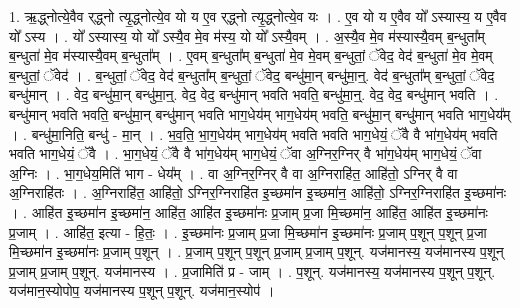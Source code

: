 \documentclass[17pt]{extarticle}
\begin{document}
1. ऋ॒द्ध्नोत्ये॒वैव र्‌द्ध्नो त्यृ॒द्ध्नोत्ये॒व यो य ए॒व र्‌द्ध्नो त्यृ॒द्ध्नोत्ये॒व यः । . ए॒व यो य ए॒वैव यो᳚ ऽस्यास्य॒ य ए॒वैव यो᳚ ऽस्य । . यो᳚ ऽस्यास्य॒ यो यो᳚ ऽस्यै॒व मे॒व म॑स्य॒ यो यो᳚ ऽस्यै॒वम् । . अ॒स्यै॒व मे॒व म॑स्यास्यै॒वम् ब॒न्धुता᳚म् ब॒न्धुता॑ मे॒व म॑स्यास्यै॒वम् ब॒न्धुता᳚म् । . ए॒वम् ब॒न्धुता᳚म् ब॒न्धुता॑ मे॒व मे॒वम् ब॒न्धुतां॒ ॅवेद॒ वेद॑ ब॒न्धुता॑ मे॒व मे॒वम् ब॒न्धुतां॒ ॅवेद॑ । . ब॒न्धुतां॒ ॅवेद॒ वेद॑ ब॒न्धुता᳚म् ब॒न्धुतां॒ ॅवेद॒ बन्धु॑मा॒न् बन्धु॑मा॒न्॒. वेद॑ ब॒न्धुता᳚म् ब॒न्धुतां॒ ॅवेद॒ बन्धु॑मान् । . वेद॒ बन्धु॑मा॒न् बन्धु॑मा॒न्॒. वेद॒ वेद॒ बन्धु॑मान् भवति भवति॒ बन्धु॑मा॒न्॒. वेद॒ वेद॒ बन्धु॑मान् भवति । . बन्धु॑मान् भवति भवति॒ बन्धु॑मा॒न् बन्धु॑मान् भवति भाग॒धेय॑म् भाग॒धेय॑म् भवति॒ बन्धु॑मा॒न् बन्धु॑मान् भवति भाग॒धेय᳚म् । . बन्धु॑मा॒निति॒ बन्धु॑ - मा॒न् । . भ॒व॒ति॒ भा॒ग॒धेय॑म् भाग॒धेय॑म् भवति भवति भाग॒धेयं॒ ॅवै वै भा॑ग॒धेय॑म् भवति भवति भाग॒धेयं॒ ॅवै । . भा॒ग॒धेयं॒ ॅवै वै भा॑ग॒धेय॑म् भाग॒धेयं॒ ॅवा अ॒ग्निर॒ग्निर् वै भा॑ग॒धेय॑म् भाग॒धेयं॒ ॅवा अ॒ग्निः । . भा॒ग॒धेय॒मिति॑ भाग - धेय᳚म् । . वा अ॒ग्निर॒ग्निर् वै वा अ॒ग्निराहि॑त॒ आहि॑तो॒ ऽग्निर् वै वा अ॒ग्निराहि॑तः । . अ॒ग्निराहि॑त॒ आहि॑तो॒ ऽग्निर॒ग्निराहि॑त इ॒च्छमा॑न इ॒च्छमा॑न॒ आहि॑तो॒ ऽग्निर॒ग्निराहि॑त इ॒च्छमा॑नः । . आहि॑त इ॒च्छमा॑न इ॒च्छमा॑न॒ आहि॑त॒ आहि॑त इ॒च्छमा॑नः प्र॒जाम् प्र॒जा मि॒च्छमा॑न॒ आहि॑त॒ आहि॑त इ॒च्छमा॑नः प्र॒जाम् । . आहि॑त॒ इत्या - हि॒तः॒ । . इ॒च्छमा॑नः प्र॒जाम् प्र॒जा मि॒च्छमा॑न इ॒च्छमा॑नः प्र॒जाम् प॒शून् प॒शून् प्र॒जा मि॒च्छमा॑न इ॒च्छमा॑नः प्र॒जाम् प॒शून् । . प्र॒जाम् प॒शून् प॒शून् प्र॒जाम् प्र॒जाम् प॒शून्. यज॑मानस्य॒ यज॑मानस्य प॒शून् प्र॒जाम् प्र॒जाम् प॒शून्. यज॑मानस्य । . प्र॒जामिति॑ प्र - जाम् । . प॒शून्. यज॑मानस्य॒ यज॑मानस्य प॒शून् प॒शून्. यज॑मान॒स्योपोप॒ यज॑मानस्य प॒शून् प॒शून्. यज॑मान॒स्योप॑ । \newline
\end{document}
